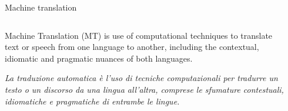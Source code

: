 \documentclass[aspectratio=169]{beamer}
\begin{document}
    \begin{frame}{Machine translation}
        \begin{columns}[t]
            \begin{column}{.48\textwidth}
                \begin{minipage}[t][.42\textheight]{\textwidth}
                    Machine Translation (MT) is use of computational techniques to translate text or speech from one language to another, including the contextual, idiomatic and pragmatic nuances of both languages.
                \end{minipage}
                \begin{minipage}[t][.42\textheight]{\textwidth}
                    \textit{
                    La traduzione automatica è l'uso di tecniche computazionali per tradurre un testo o un discorso da una lingua all'altra, comprese le sfumature contestuali, idiomatiche e pragmatiche di entrambe le lingue.}
                \end{minipage}
            \end{column}
            \begin{column}{.48\textwidth}
                \begin{minipage}[t][.42\textheight]{\textwidth}

                \end{minipage}\par
                \begin{minipage}[t][.42\textheight]{\textwidth}
             
                \end{minipage}
            \end{column}
        \end{columns}
    \end{frame}


\end{document}

